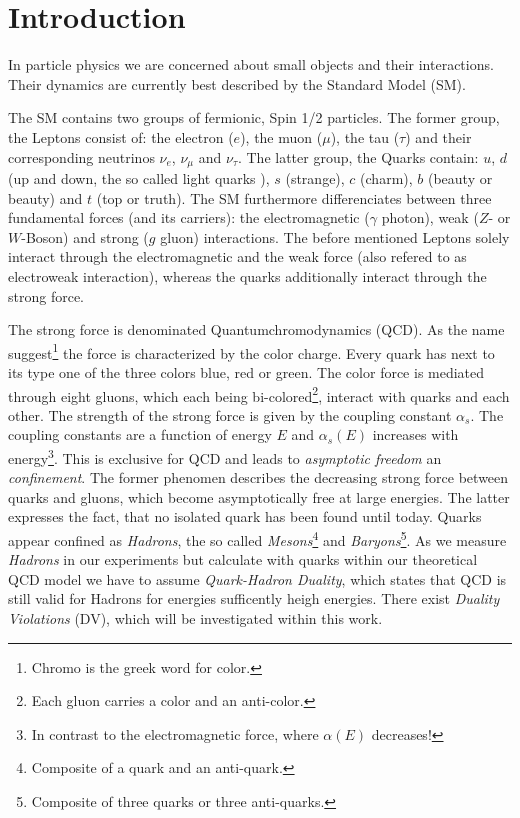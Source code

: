 \documentclass[../../index.tex]{subfiles}
\begin{document}
\chapter{Introduction}
In particle physics we are concerned about small objects and their interactions.
Their dynamics are currently best described by the Standard Model (SM).

The SM contains two groups of fermionic, Spin 1/2 particles. The former group,
the Leptons consist of: the electron ($e$), the muon ($\mu$), the tau ($\tau$)
and their corresponding neutrinos $\nu_e$, $\nu_\mu$ and $\nu_\tau$. The latter
group, the Quarks contain: $u$, $d$ (up and down, the so called light quarks ),
$s$ (strange), $c$ (charm), $b$ (beauty or beauty) and $t$ (top or truth). The SM
furthermore differenciates between three fundamental forces (and its carriers):
the electromagnetic ($\gamma$ photon), weak ($Z$- or $W$-Boson) and strong ($g$
gluon) interactions. The before mentioned Leptons solely interact through the
electromagnetic and the weak force (also refered to as electroweak interaction),
whereas the quarks additionally interact through the strong force.

The strong force is denominated Quantumchromodynamics
(QCD). As the name suggest\footnote{Chromo is the greek word for color.} the
force is characterized by the color charge. Every quark has next to its type one
of the three colors blue, red or green. The color force is mediated through
eight gluons, which each being bi-colored\footnote{Each gluon carries a color
  and an anti-color.}, interact with quarks and each other. The strength of the
strong force is given by the coupling constant $\alpha_s$. The coupling
constants are a function of energy $E$ and $\alpha_s(E)$ increases with 
energy\footnote{In contrast to the electromagnetic force, where $\alpha(E)$
  decreases!}. This is exclusive for QCD and leads to \textit{asymptotic freedom} an
\textit{confinement}. The former phenomen describes the decreasing strong force
between quarks and gluons, which become asymptotically free at large
energies. The latter expresses the fact, that no isolated quark has been found
until today. Quarks appear confined as \textit{Hadrons}, the so called
\textit{Mesons}\footnote{Composite of a quark and an anti-quark.} and
\textit{Baryons}\footnote{Composite of three quarks or three anti-quarks.}.
As we measure \textit{Hadrons} in our experiments but calculate with quarks
within our theoretical QCD model we have to assume \textit{Quark-Hadron
  Duality}, which states that QCD is still valid for Hadrons for energies
sufficently heigh energies. There exist \textit{Duality Violations} (DV), which
will be investigated within this work.
\end{document}
